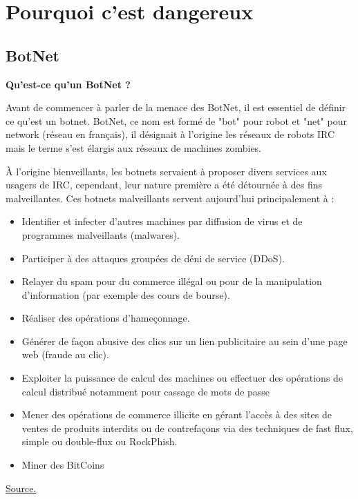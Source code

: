 \documentclass[a4paper]{report}
\begin{document}
	\newpage
	
	\section{Pourquoi c'est dangereux}
	\subsection{BotNet}
	
	\bigbreak	
	
	\begin{flushleft}
		\textbf{Qu'est-ce qu'un BotNet ?} \\
	\end{flushleft}
	
	Avant de commencer à parler de la menace des BotNet, il est essentiel de définir ce qu'est un botnet.
	BotNet, ce nom est formé de "bot" pour robot et "net" pour network (réseau en français), il désignait à l'origine les réseaux de robots
	IRC mais le terme s'est élargis aux réseaux de machines zombies.
	
	\bigbreak
	
	À l'origine bienveillants, les botnets servaient à proposer divers services aux usagers de IRC, cependant, leur nature première a été 
	détournée à des fins malveillantes. Ces botnets malveillants servent aujourd'hui principalement à :
	\begin{itemize}
		\item Identifier et infecter d’autres machines par diffusion de virus et de programmes malveillants (malwares).
		\item Participer à des attaques groupées de déni de service (DDoS).
		\item Relayer du spam pour du commerce illégal ou pour de la manipulation d'information (par exemple des cours de bourse).
		\item Réaliser des opérations d'hameçonnage.
		\item Générer de façon abusive des clics sur un lien publicitaire au sein d’une page web (fraude au clic).
		\item Exploiter la puissance de calcul des machines ou effectuer des opérations de calcul distribué notamment pour cassage de mots 
		de passe
		\item Mener des opérations de commerce illicite en gérant l'accès à des sites de ventes de produits interdits ou de contrefaçons 
		via des techniques de fast flux, simple ou double-flux ou RockPhish.
		\item Miner des BitCoins
	\end{itemize}
	\href{https://fr.wikipedia.org/wiki/Botnet#Usages_des_botnets}{Source.}
	\bigbreak
		
\end{document}
